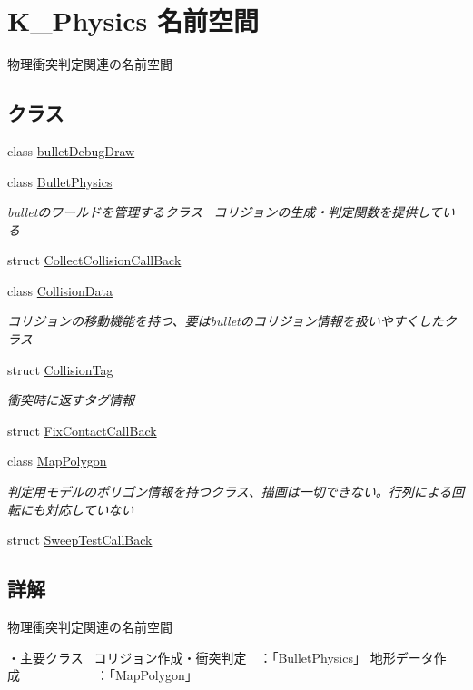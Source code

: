 \hypertarget{namespace_k___physics}{}\section{K\+\_\+\+Physics 名前空間}
\label{namespace_k___physics}


物理衝突判定関連の名前空間  


\subsection*{クラス}
\begin{DoxyCompactItemize}
\item 
class \mbox{\hyperlink{class_k___physics_1_1bullet_debug_draw}{bullet\+Debug\+Draw}}
\item 
class \mbox{\hyperlink{class_k___physics_1_1_bullet_physics}{Bullet\+Physics}}
\begin{DoxyCompactList}\small\item\em bulletのワールドを管理するクラス~\newline
コリジョンの生成・判定関数を提供している \end{DoxyCompactList}\item 
struct \mbox{\hyperlink{struct_k___physics_1_1_collect_collision_call_back}{Collect\+Collision\+Call\+Back}}
\item 
class \mbox{\hyperlink{class_k___physics_1_1_collision_data}{Collision\+Data}}
\begin{DoxyCompactList}\small\item\em コリジョンの移動機能を持つ、要はbulletのコリジョン情報を扱いやすくしたクラス \end{DoxyCompactList}\item 
struct \mbox{\hyperlink{struct_k___physics_1_1_collision_tag}{Collision\+Tag}}
\begin{DoxyCompactList}\small\item\em 衝突時に返すタグ情報 \end{DoxyCompactList}\item 
struct \mbox{\hyperlink{struct_k___physics_1_1_fix_contact_call_back}{Fix\+Contact\+Call\+Back}}
\item 
class \mbox{\hyperlink{class_k___physics_1_1_map_polygon}{Map\+Polygon}}
\begin{DoxyCompactList}\small\item\em 判定用モデルのポリゴン情報を持つクラス、描画は一切できない。行列による回転にも対応していない \end{DoxyCompactList}\item 
struct \mbox{\hyperlink{struct_k___physics_1_1_sweep_test_call_back}{Sweep\+Test\+Call\+Back}}
\end{DoxyCompactItemize}


\subsection{詳解}
物理衝突判定関連の名前空間 

・主要クラス~\newline
コリジョン作成・衝突判定　：「\+Bullet\+Physics」 地形データ作成　　　　　　：「\+Map\+Polygon」 